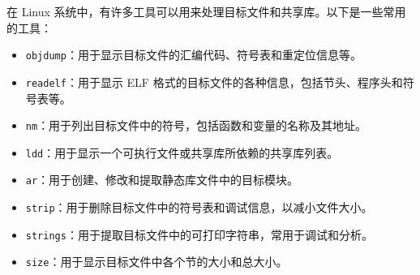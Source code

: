 在 Linux 系统中，有许多工具可以用来处理目标文件和共享库。以下是一些常用的工具：

\begin{itemize}
    \item \texttt{objdump}：用于显示目标文件的汇编代码、符号表和重定位信息等。
    \item \texttt{readelf}：用于显示 ELF 格式的目标文件的各种信息，包括节头、程序头和符号表等。
    \item \texttt{nm}：用于列出目标文件中的符号，包括函数和变量的名称及其地址。
    \item \texttt{ldd}：用于显示一个可执行文件或共享库所依赖的共享库列表。
    \item \texttt{ar}：用于创建、修改和提取静态库文件中的目标模块。
    \item \texttt{strip}：用于删除目标文件中的符号表和调试信息，以减小文件大小。
    \item \texttt{strings}：用于提取目标文件中的可打印字符串，常用于调试和分析。
    \item \texttt{size}：用于显示目标文件中各个节的大小和总大小。
\end{itemize}

\newpage